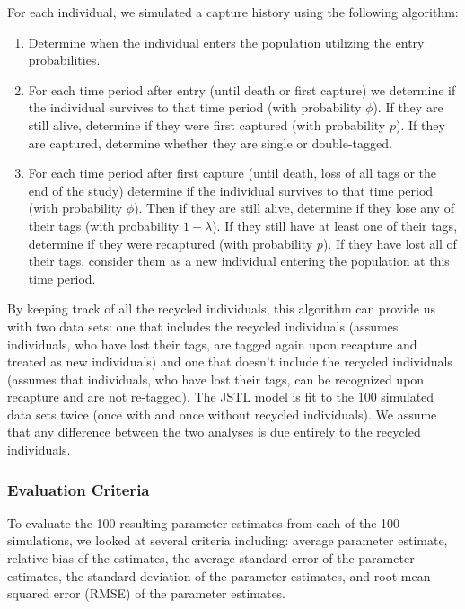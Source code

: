 \documentclass[]{article}
\begin{document}
For each individual, we simulated a capture history using the following
algorithm:

\begin{enumerate}
\def\labelenumi{\arabic{enumi}.}
\item
  Determine when the individual enters the population utilizing the
  entry probabilities.
\item
  For each time period after entry (until death or first capture) we
  determine if the individual survives to that time period (with
  probability \(\phi\)). If they are still alive, determine if they were
  first captured (with probability \(p\)). If they are captured,
  determine whether they are single or double-tagged.
\item
  For each time period after first capture (until death, loss of all
  tags or the end of the study) determine if the individual survives to
  that time period (with probability \(\phi\)). Then if they are still
  alive, determine if they lose any of their tags (with probability
  \(1-\lambda\)). If they still have at least one of their tags,
  determine if they were recaptured (with probability \(p\)). If they
  have lost all of their tags, consider them as a new individual
  entering the population at this time period.
\end{enumerate}

By keeping track of all the recycled individuals, this algorithm can
provide us with two data sets: one that includes the recycled
individuals (assumes individuals, who have lost their tags, are tagged
again upon recapture and treated as new individuals) and one that
doesn't include the recycled individuals (assumes that individuals, who
have lost their tags, can be recognized upon recapture and are not
re-tagged). The JSTL model is fit to the 100 simulated data sets twice
(once with and once without recycled individuals). We assume that any
difference between the two analyses is due entirely to the recycled
individuals.

\subsubsection{Evaluation Criteria}\label{evaluation-criteria}

To evaluate the 100 resulting parameter estimates from each of the 100
simulations, we looked at several criteria including: average parameter
estimate, relative bias of the estimates, the average standard error of
the parameter estimates, the standard deviation of the parameter
estimates, and root mean squared error (RMSE) of the parameter
estimates.
\end{document}

